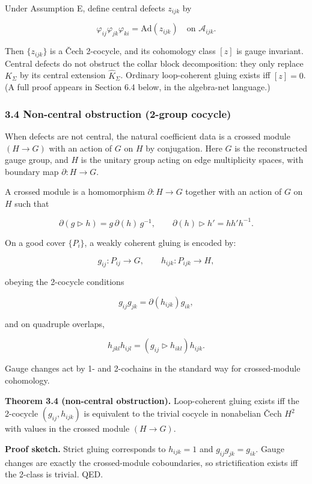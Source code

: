 Under Assumption E, define central defects \(z_{ijk}\) by

\[
\varphi_{ij} \varphi_{jk} \varphi_{ki} = \mathrm{Ad}(z_{ijk}) \quad \text{on } \mathcal{A}_{ijk}.
\]

Then \(\{z_{ijk}\}\) is a \v{C}ech 2-cocycle, and its cohomology class \([z]\) is gauge invariant. Central defects do not obstruct the collar block decomposition: they only replace \(K_\Sigma\) by its central extension \(\widehat K_\Sigma\). Ordinary loop-coherent gluing exists iff \([z] = 0\). (A full proof appears in Section 6.4 below, in the algebra-net language.)

\subsubsection{3.4 Non-central obstruction (2-group cocycle)}\label{34-non-central-obstruction-2-group-cocycle}

When defects are not central, the natural coefficient data is a crossed module \((H \to G)\) with an action of \(G\) on \(H\) by conjugation. Here \(G\) is the reconstructed gauge group, and \(H\) is the unitary group acting on edge multiplicity spaces, with boundary map \(\partial: H \to G\).

A crossed module is a homomorphism \(\partial: H \to G\) together with an action of \(G\) on \(H\) such that

\[
\partial(g \triangleright h) = g\,\partial(h)\,g^{-1},
\qquad
\partial(h) \triangleright h' = h h' h^{-1}.
\]

On a good cover \(\{P_i\}\), a weakly coherent gluing is encoded by:

\[
g_{ij}: P_{ij} \to G,\qquad h_{ijk}: P_{ijk} \to H,
\]

obeying the 2-cocycle conditions

\[
g_{ij} g_{jk} = \partial(h_{ijk}) g_{ik},
\]

and on quadruple overlaps,

\[
h_{jkl} h_{ijl} = (g_{ij} \triangleright h_{ikl}) h_{ijk}.
\]

Gauge changes act by 1- and 2-cochains in the standard way for crossed-module cohomology.

\textbf{Theorem 3.4 (non-central obstruction).} Loop-coherent gluing exists iff the 2-cocycle \((g_{ij}, h_{ijk})\) is equivalent to the trivial cocycle in nonabelian \v{C}ech \(H^2\) with values in the crossed module \((H \to G)\).

\textbf{Proof sketch.} Strict gluing corresponds to \(h_{ijk}=1\) and \(g_{ij}g_{jk}=g_{ik}\). Gauge changes are exactly the crossed-module coboundaries, so strictification exists iff the 2-class is trivial. QED.

